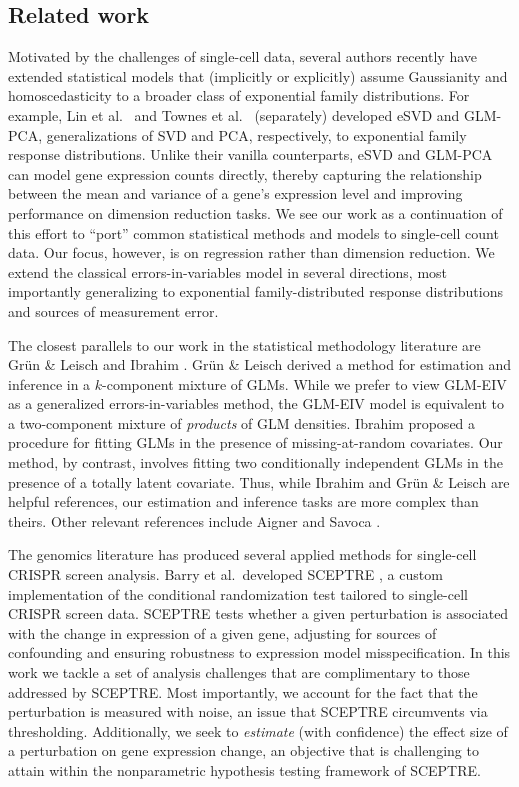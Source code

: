 \documentclass[12pt]{article}
\begin{document}
\subsection{Related work}
Motivated by the challenges of single-cell data, several authors recently have extended statistical models that (implicitly or explicitly) assume Gaussianity and homoscedasticity to a broader class of exponential family distributions. For example, Lin et al.\ \cite{Lin2021} and Townes et al.\ \cite{Townes2019}  (separately) developed eSVD and GLM-PCA, generalizations of SVD and PCA, respectively, to exponential family response distributions. Unlike their vanilla counterparts, eSVD and GLM-PCA can model gene expression counts directly, thereby capturing the relationship between the mean and variance of a gene's expression level \cite{Lause2021} and improving performance on dimension reduction tasks. We see our work as a continuation of this effort to ``port'' common statistical methods and models to single-cell count data. Our focus, however, is on regression rather than dimension reduction. We extend the classical errors-in-variables model in several directions, most importantly generalizing to exponential family-distributed response distributions and sources of measurement error.

The closest parallels to our work in the statistical methodology literature are Gr\"{u}n \& Leisch \cite{Grun2008} and Ibrahim \cite{Ibrahim1990}. Gr\"{u}n \& Leisch derived a method for estimation and inference in a $k$-component mixture of GLMs. While we prefer to view GLM-EIV as a generalized errors-in-variables method,  the GLM-EIV model is equivalent to a two-component mixture of \textit{products} of GLM densities. Ibrahim proposed a procedure for fitting GLMs in the presence of missing-at-random covariates. Our method, by contrast, involves fitting two conditionally independent GLMs in the presence of a totally latent covariate. Thus, while Ibrahim and Gr\"{u}n \& Leisch are helpful references, our estimation and inference tasks are more complex than theirs. Other relevant references include Aigner \cite{Aigner1973} and Savoca \cite{Savoca2000}.

The genomics literature has produced several applied methods for single-cell CRISPR screen analysis. Barry et al.\ developed SCEPTRE \cite{Barry2021}, a custom implementation of the conditional randomization test \cite{Candes2018, Liu2021} tailored to single-cell CRISPR screen data. SCEPTRE tests whether a given perturbation is associated with the change in expression of a given gene, adjusting for sources of confounding and ensuring robustness to expression model misspecification. In this work we tackle a set of analysis challenges that are complimentary to those addressed by SCEPTRE. Most importantly, we account for the fact that the perturbation is measured with noise, an issue that SCEPTRE circumvents via thresholding. Additionally, we seek to \textit{estimate} (with confidence) the effect size of a perturbation on gene expression change, an objective that is challenging to attain within the nonparametric hypothesis testing framework of SCEPTRE.
\end{document}
